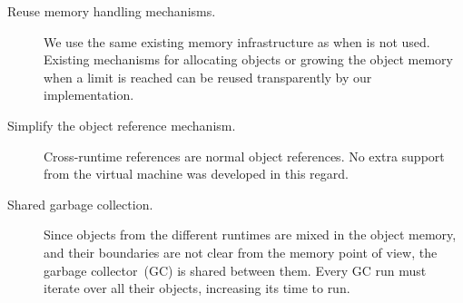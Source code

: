 \begin{description}
	\item[Reuse memory handling mechanisms.] We use the same existing memory infrastructure as when \Vtt is not used. Existing mechanisms for allocating objects or growing the object memory when a limit is reached can be reused transparently by our implementation. 
	\item[Simplify the object reference mechanism.] Cross-runtime references are normal object references. No extra support from the virtual machine was developed in this regard.
	\item[Shared garbage collection.] Since objects from the different runtimes are mixed in the object memory, and their boundaries are not clear from the memory point of view, the garbage collector~(GC) is shared between them. Every GC run must iterate over all their objects, increasing its time to run.
\end{description}



